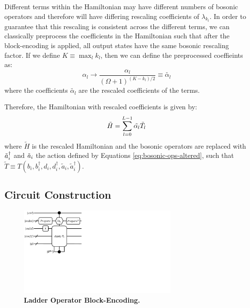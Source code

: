 Different terms within the Hamiltonian may have different numbers of bosonic operators and therefore will have differing rescaling coefficients of $\lambda_{k_l}$.
In order to guarantee that this rescaling is consistent across the different terms, we can classically preprocess the coefficients in the Hamiltonian such that after the block-encoding is applied, all output states have the same bosonic rescaling factor.
If we define $K \equiv \max_l{k_l}$, then we can define the preprocessed coeffieints as:
\begin{equation}
    \label{bose coeff rescale}
    \alpha_l \rightarrow \frac{\alpha_l}{(\Omega + 1)^{(K - k_l)/2}} \equiv \tilde{\alpha_l}
\end{equation}
where the coefficients $\tilde{\alpha_l}$ are the rescaled coefficients of the terms.

Therefore, the Hamiltonian with rescaled coefficients is given by:
\begin{equation}
    \tilde{H} = \sum_{l=0}^{L-1} \tilde{\alpha_l} \Tilde{T}_l
\end{equation}
where $\tilde{H}$ is the rescaled Hamiltonian and the bosonic operators are replaced with $\Tilde{a}_i^\dagger$ and $\Tilde{a}_i$ the action defined by Equations \ref{eq:bosonic-ops-altered}, such that $\tilde{T} \equiv T(b_i, b_i^\dagger, d_i, d_i^\dagger, \tilde{a}_i, \tilde{a}_i^\dagger)$.

\subsection{Circuit Construction}
\label{subsec:circuit}

\begin{figure}
    \centering
    \includegraphics[width=8cm]{figures/lobe-block-encoding.pdf}
    \caption{\textbf{Ladder Operator Block-Encoding.}
    }
    \label{fig:lobe}
\end{figure}

